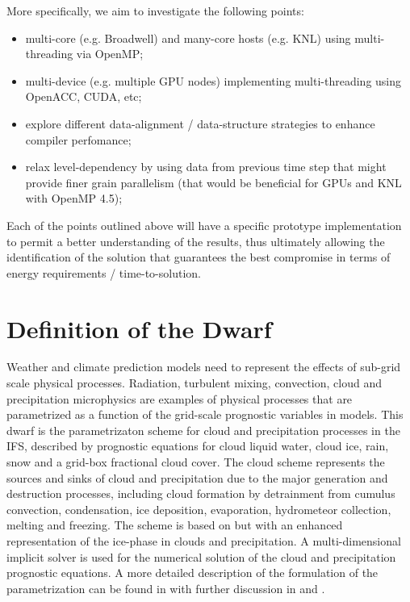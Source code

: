 \documentclass[
a4paper,     %
12pt,        %
article,
onecolumn,   %
openany,     %
]{memoir}
\begin{document}
More specifically, we aim to investigate the following points:
%
\begin{itemize}
\item multi-core (e.g. Broadwell) and many-core hosts (e.g. KNL) 
using multi-threading via OpenMP;
\item multi-device (e.g. multiple GPU nodes) implementing multi-threading 
using OpenACC, CUDA, etc;
\item explore different data-alignment / data-structure strategies 
to enhance compiler perfomance;
\item relax level-dependency by using data from previous time step 
that might provide finer grain parallelism (that would be beneficial 
for GPUs and KNL with OpenMP 4.5);
\end{itemize}
%
Each of the points outlined above will have a specific prototype 
implementation to permit a better understanding of the results, 
thus ultimately allowing the identification of the solution that 
guarantees the best compromise in terms of energy requirements 
/ time-to-solution.




\section{Definition of the Dwarf}
Weather and climate prediction models need to represent the 
effects of sub-grid scale physical processes. Radiation, turbulent 
mixing, convection, cloud and precipitation microphysics are 
examples of physical processes that are parametrized as a function 
of the grid-scale prognostic variables in models. This dwarf 
is the parametrizaton scheme for cloud and precipitation processes 
in the IFS, described by prognostic equations for cloud liquid water, 
cloud ice, rain, snow and a grid-box fractional cloud cover. The cloud 
scheme represents the sources and sinks of cloud and precipitation due 
to the major generation and destruction processes, including cloud formation 
by detrainment from cumulus convection, condensation, ice deposition, evaporation, 
hydrometeor collection, melting and freezing. The scheme is based on \cite{Tiedtke1993} 
but with an enhanced representation of the ice-phase in clouds and precipitation. 
A multi-dimensional implicit solver is used for the numerical solution of 
the cloud and precipitation prognostic equations.  A more detailed description 
of the formulation of the parametrization can be found in \cite{IFSdoc} with 
further discussion in \cite{ForbesandTompkins2011} and \cite{Forbesetal2011}.
\end{document}
